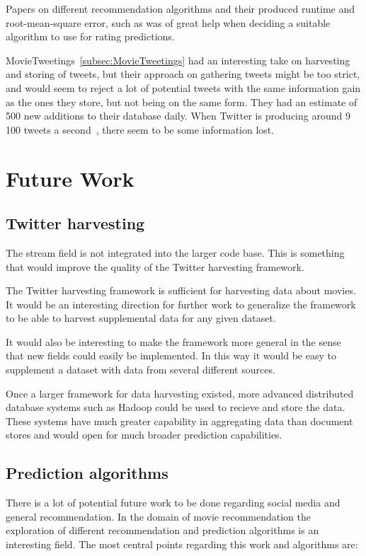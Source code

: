 Papers on different recommendation algorithms and their produced runtime and root-mean-square error, such as \cite{bigchaos-sol,alsMPI,BellKor-CF-TD} was of great help when deciding a suitable algorithm to use for rating predictions.

MovieTweetings~\ref{subsec:MovieTweetings} had an interesting take on harvesting and storing of tweets, but their approach on gathering tweets might be too strict, and would seem to reject a lot of potential tweets with the same information gain as the ones they store, but not being on the same form. They had an estimate of 500 new additions to their database daily. When Twitter is producing around 9 100 tweets a second~\cite{twitt-stats}, there seem to be some information lost.



\section{Future Work}
\subsection{Twitter harvesting}
The stream field is not integrated into the larger code base. This is something that would improve the quality of the Twitter harvesting framework.

The Twitter harvesting framework is sufficient for harvesting data about movies. It would be an interesting direction for further work to generalize the framework to be able to harvest supplemental data for any given dataset.

It would also be interesting to make the framework more general in the sense that new fields could easily be implemented. In this way it would be easy to supplement a dataset with data from several different sources.

Once a larger framework for data harvesting existed, more advanced distributed database systems such as Hadoop could be used to recieve and store the data. These systems have much greater capability in aggregating data than document stores and would open for much broader prediction capabilities.


\subsection{Prediction algorithms}
There is a lot of potential future work to be done regarding social media and general recommendation. In the domain of movie recommendation the exploration of different recommendation and prediction algorithms is an interesting field. The most central points regarding this work and algorithms are:

